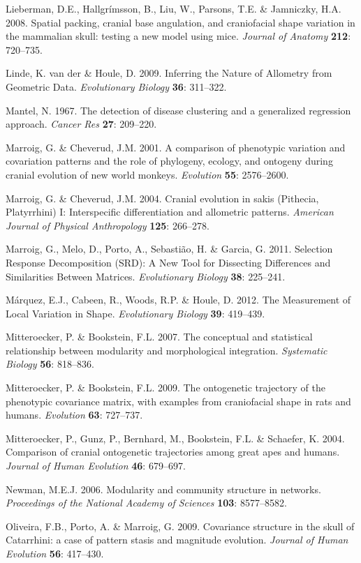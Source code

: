 \documentclass[11pt,twoside]{report}
\begin{document}
Lieberman, D.E., Hallgrímsson, B., Liu, W., Parsons, T.E. \& Jamniczky,
H.A. 2008. Spatial packing, cranial base angulation, and craniofacial
shape variation in the mammalian skull: testing a new model using mice.
\emph{Journal of Anatomy} \textbf{212}: 720--735.

Linde, K. van der \& Houle, D. 2009. Inferring the Nature of Allometry
from Geometric Data. \emph{Evolutionary Biology} \textbf{36}: 311--322.

Mantel, N. 1967. The detection of disease clustering and a generalized
regression approach. \emph{Cancer Res} \textbf{27}: 209--220.

Marroig, G. \& Cheverud, J.M. 2001. A comparison of phenotypic variation
and covariation patterns and the role of phylogeny, ecology, and
ontogeny during cranial evolution of new world monkeys. \emph{Evolution}
\textbf{55}: 2576--2600.

Marroig, G. \& Cheverud, J.M. 2004. Cranial evolution in sakis
(Pithecia, Platyrrhini) I: Interspecific differentiation and allometric
patterns. \emph{American Journal of Physical Anthropology} \textbf{125}:
266--278.

Marroig, G., Melo, D., Porto, A., Sebastião, H. \& Garcia, G. 2011.
Selection Response Decomposition (SRD): A New Tool for Dissecting
Differences and Similarities Between Matrices. \emph{Evolutionary
Biology} \textbf{38}: 225--241.

Márquez, E.J., Cabeen, R., Woods, R.P. \& Houle, D. 2012. The
Measurement of Local Variation in Shape. \emph{Evolutionary Biology}
\textbf{39}: 419--439.

Mitteroecker, P. \& Bookstein, F.L. 2007. The conceptual and statistical
relationship between modularity and morphological integration.
\emph{Systematic Biology} \textbf{56}: 818--836.

Mitteroecker, P. \& Bookstein, F.L. 2009. The ontogenetic trajectory of
the phenotypic covariance matrix, with examples from craniofacial shape
in rats and humans. \emph{Evolution} \textbf{63}: 727--737.

Mitteroecker, P., Gunz, P., Bernhard, M., Bookstein, F.L. \& Schaefer,
K. 2004. Comparison of cranial ontogenetic trajectories among great apes
and humans. \emph{Journal of Human Evolution} \textbf{46}: 679--697.

Newman, M.E.J. 2006. Modularity and community structure in networks.
\emph{Proceedings of the National Academy of Sciences} \textbf{103}:
8577--8582.

Oliveira, F.B., Porto, A. \& Marroig, G. 2009. Covariance structure in
the skull of Catarrhini: a case of pattern stasis and magnitude
evolution. \emph{Journal of Human Evolution} \textbf{56}: 417--430.
\end{document}
